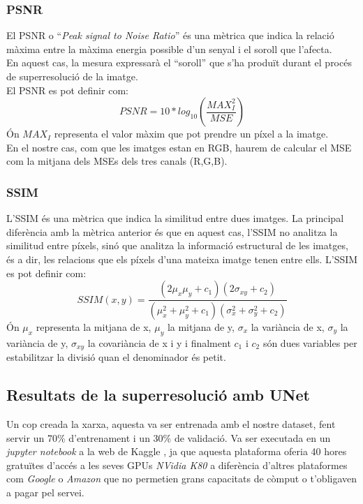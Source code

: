 ﻿\documentclass[10pt,a4paper,twocolumn,twoside]{article}
\begin{document}
\subsubsection{PSNR}
El PSNR o ``\textit{Peak signal to Noise Ratio}'' és una mètrica que indica la relació màxima entre la màxima energia possible d'un senyal i el soroll que l'afecta.\\En aquest cas, la mesura expressarà el ``soroll'' que s'ha produït durant el procés de superresolució de la imatge.\\

El PSNR es pot definir com:
\[ PSNR = 10 * log_{10} \left(\frac{MAX^2_I}{MSE}\right)\]
Ón \(MAX_I\) representa el valor màxim que pot prendre un píxel a la imatge.\\
En el nostre cas, com que les imatges estan en RGB, haurem de calcular el MSE com la mitjana dels MSEs dels tres canals (R,G,B).

\subsubsection{SSIM}
L'SSIM és una mètrica que indica la similitud entre dues imatges. La principal diferència amb la mètrica anterior és que en aquest cas, l'SSIM no analitza la similitud entre píxels, sinó que analitza la informació estructural de les imatges, és a dir, les relacions que els píxels d'una mateixa imatge tenen entre ells. L'SSIM es pot definir com:
\[SSIM(x,y) = \frac{(2\mu_x\mu_y + c_1)(2\sigma_{xy} + c_2)}{(\mu^2_x + \mu^2_y + c_1)(\sigma^2_x + \sigma^2_y + c_2)}\]
Ón \(\mu_x\) representa la mitjana de x, \(\mu_y\) la mitjana de y, \(\sigma_x\) la variància de x, \(\sigma_y\) la variància de y, \(\sigma_{xy}\) la covariància de x i y i finalment \(c_1\) i \(c_2\) són dues variables per estabilitzar la divisió quan el denominador és petit.

\subsection{Resultats de la superresolució amb UNet}
\label{section:resUNet}

Un cop creada la xarxa, aquesta va ser entrenada amb el nostre dataset, fent servir un 70\% d'entrenament i un 30\% de validació. Va ser executada en un \textit{jupyter notebook} a la web de Kaggle \cite{notebookKagle}, ja que aquesta plataforma oferia 40 hores gratuïtes d'accés a les seves GPUs \textit{NVidia K80} a diferència d'altres plataformes com \textit{Google} o \textit{Amazon} que no permetien grans capacitats de còmput o t'obligaven a pagar pel servei.\\
\end{document}

